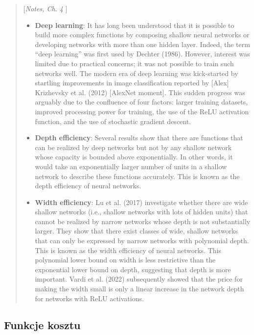 \documentclass{myclass}
\numberwithin{equation}{subsection}
\begin{document}
\begin{quote}[\textit{Notes, Ch. 4} \cite{prince2023understanding}]
\begin{itemize}
\item \textbf{Deep learning}: It has long been understood that it is possible to build more complex
functions by composing shallow neural networks or developing networks with more than one hidden
layer. Indeed, the term “deep learning” was first used by Dechter (1986). However, interest was
limited due to practical concerns; it was not possible to train such networks well. The modern era
of deep learning was kick-started by startling improvements in image classification reported by
[Alex] Krizhevsky et al. (2012) [AlexNet moment]. This sudden progress was arguably due to the
confluence of four factors: larger training datasets, improved processing power for training, the
use of the ReLU activation function, and the use of stochastic gradient descent.

\item \textbf{Depth efficiency}: Several results show that there are functions that can be realized
by deep networks but not by any shallow network whose capacity is bounded above exponentially. In
other words, it would take an exponentially larger number of units in a shallow network to describe
these functions accurately. This is known as the depth efficiency of neural networks.

\item \textbf{Width efficiency}: Lu et al. (2017) investigate whether there are wide shallow
networks (i.e., shallow networks with lots of hidden units) that cannot be realized by narrow
networks whose depth is not substantially larger. They show that there exist classes of wide,
shallow networks that can only be expressed by narrow networks with polynomial depth. This is known
as the width efficiency of neural networks. This polynomial lower bound on width is less restrictive
than the exponential lower bound on depth, suggesting that depth is more important. Vardi et al.
(2022) subsequently showed that the price for making the width small is only a linear increase in
the network depth for networks with ReLU activations.
\end{itemize}
\end{quote}


\subsection{Funkcje kosztu}
\end{document}

